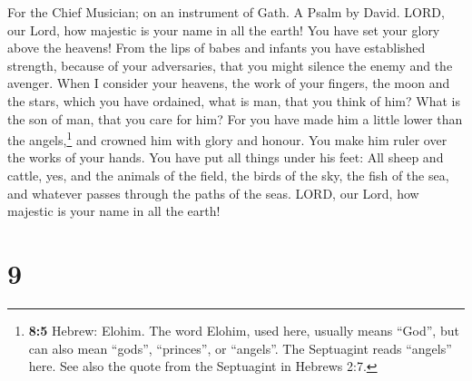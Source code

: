 For the Chief Musician; on an instrument of Gath. A Psalm by David.
 LORD, our Lord, how majestic is your name in all the
earth! You have set your glory above the heavens!  From
the lips of babes and infants you have established strength, because of
your adversaries, that you might silence the enemy and the avenger.
 When I consider your heavens, the work of your fingers,
the moon and the stars, which you have ordained,  what is
man, that you think of him? What is the son of man, that you care for
him?  For you have made him a little lower than the
angels,\footnote{\textbf{8:5} Hebrew: Elohim. The word Elohim, used
  here, usually means ``God'', but can also mean ``gods'', ``princes'',
  or ``angels''. The Septuagint reads ``angels'' here. See also the
  quote from the Septuagint in Hebrews 2:7.} and crowned him with glory
and honour.  You make him ruler over the works of your
hands. You have put all things under his feet:  All sheep
and cattle, yes, and the animals of the field,  the birds
of the sky, the fish of the sea, and whatever passes through the paths
of the seas.  LORD, our Lord, how majestic is your name in
all the earth!

\hypertarget{section-8}{%
\section{9}\label{section-8}}

